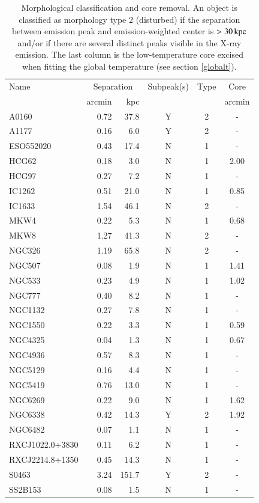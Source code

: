 \documentclass[structabstract]{aa}
\begin{document}
\begin{table}[tbp]
  \caption{Morphological classification and core removal. An object is classified as morphology type 2
    (disturbed) if the separation between emission peak and
    emission-weighted center is $>\unit[30]{kpc}$ and/or if there are several
    distinct peaks visible in the X-ray emission. The last column is the low-temperature core excised when fitting the global temperature (see section \ref{globalt}).}
\begin{center}
\setlength\extrarowheight{2pt}
 \begin{tabularx}{\linewidth}{Xrrccc}\hline\hline
Name & \multicolumn{2}{c}{Separation} & Subpeak(s) & Type & Core\\
 & arcmin & kpc & & & arcmin \\  \hline
A0160  & 0.72 & 37.8 & Y & 2 & - \\ 
A1177  & 0.16 & 6.0 & Y & 2 & - \\ 
ESO552020  & 0.43 & 17.4 & N & 1 & - \\ 
HCG62  & 0.18 & 3.0 & N & 1 & 2.00 \\ 
HCG97  & 0.27 & 7.2 & N & 1 & - \\ 
IC1262  & 0.51 & 21.0 & N & 1 & 0.85 \\ 
IC1633  & 1.54 & 46.1 & N & 2 & - \\ 
MKW4  & 0.22 & 5.3 & N & 1 & 0.68 \\ 
MKW8  & 1.27 & 41.3 & N & 2 & - \\ 
NGC326  & 1.19 & 65.8 & N & 2 & - \\ 
NGC507  & 0.08 & 1.9 & N & 1 & 1.41 \\ 
NGC533  & 0.23 & 4.9 & N & 1 & 1.02 \\ 
NGC777  & 0.40 & 8.2 & N & 1 & - \\ 
NGC1132  & 0.27 & 7.8 & N & 1 & - \\ 
NGC1550  & 0.22 & 3.3 & N & 1 & 0.59 \\ 
NGC4325  & 0.04 & 1.3 & N & 1 & 0.67 \\ 
NGC4936  & 0.57 & 8.3 & N & 1 & - \\ 
NGC5129  & 0.16 & 4.4 & N & 1 & - \\ 
NGC5419  & 0.76 & 13.0 & N & 1 & - \\ 
NGC6269  & 0.22 & 9.0 & N & 1 & 1.62 \\ 
NGC6338  & 0.42 & 14.3 & Y & 2 & 1.92 \\ 
NGC6482  & 0.07 & 1.1 & N & 1 & - \\ 
RXCJ1022.0+3830  & 0.11 & 6.2 & N & 1 & - \\ 
RXCJ2214.8+1350  & 0.45 & 14.3 & N & 1 & - \\ 
S0463  & 3.24 & 151.7 & Y & 2 & - \\ 
SS2B153  & 0.08 & 1.5 & N & 1 & - \\  \hline
\end{tabularx}
\end{center}
\label{tab:morphology}
\end{table}
\end{document}
